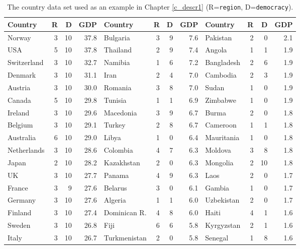 \begin{table}
\caption{The country data set used as an example
in Chapter \ref{c_descr1} (R=\texttt{region}, D=\texttt{democracy}).}
\label{t_countrydata}
%
{\footnotesize
\begin{ttfamily}
\begin{tabular}{|lrrr|lrrr|lrrr|}\hline
Country & R & D & GDP &
Country & R & D & GDP &
Country & R & D & GDP \\  \hline
Norway        & 3 & 10 &37.8 &Bulgaria      & 3 &  9 & 7.6&Pakistan     &2& 0&  2.1\\
USA           & 5 & 10 &37.8 &Thailand      & 2 &  9 & 7.4&Angola       &1& 1&  1.9\\
Switzerland   & 3 & 10 &32.7 &Namibia       & 1 &  6 & 7.2&Bangladesh   &2& 6&  1.9\\
Denmark       & 3 & 10 &31.1 &Iran          & 2 &  4 & 7.0&Cambodia     &2& 3&  1.9\\
Austria       & 3 & 10 &30.0 &Romania       & 3 &  8 & 7.0&Sudan        &1& 0&  1.9\\
Canada        & 5 & 10 &29.8 &Tunisia       & 1 &  1 & 6.9&Zimbabwe     &1& 0&  1.9\\
Ireland       & 3 & 10 &29.6 &Macedonia     & 3 &  9 & 6.7&Burma        &2& 0&  1.8\\
Belgium       & 3 & 10 &29.1 &Turkey        & 2 &  8 & 6.7&Cameroon     &1& 1&  1.8\\
Australia     & 6 & 10 &29.0 &Libya         & 1 &  0 & 6.4&Mauritania   &1& 0&  1.8\\
Netherlands   & 3 & 10 &28.6 &Colombia      & 4 &  7 & 6.3&Moldova      &3& 8&  1.8\\
Japan         & 2 & 10 &28.2 &Kazakhstan    & 2 &  0 & 6.3&Mongolia     &2&10&  1.8\\
UK            & 3 & 10 &27.7 &Panama        & 4 &  9 & 6.3&Laos         &2& 0&  1.7\\
France        & 3 &  9 &27.6 &Belarus       & 3 &  0 & 6.1&Gambia       &1& 0&  1.7\\
Germany       & 3 & 10 &27.6 &Algeria       & 1 &  1 & 6.0&Uzbekistan   &2& 0&  1.7\\
Finland       & 3 & 10 &27.4 &Dominican R.  & 4 &  8 & 6.0&Haiti        &4& 1&  1.6\\
Sweden        & 3 & 10 &26.8 &Fiji          & 6 &  6 & 5.8&Kyrgyzstan   &2& 1&  1.6\\
Italy         & 3 & 10 &26.7 &Turkmenistan  & 2 &  0 & 5.8&Senegal      &1& 8&  1.6\\

\end{tabular}
\end{ttfamily}}
\end{table}
